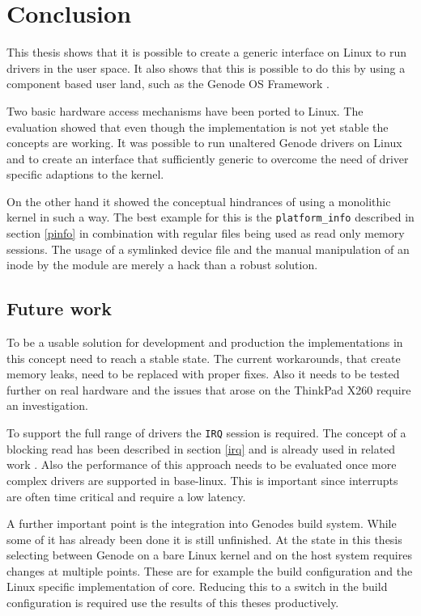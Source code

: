 \documentclass[
a4paper,
12pt,
notitlepage,
parskip=half,
DIV=11,
]{scrbook}
\begin{document}
	\chapter{Conclusion}
	
		This thesis shows that it is possible to create a generic interface on Linux to run drivers in the user space.
		It also shows that this is possible to do this by using a component based user land, such as the Genode OS Framework \citep{genode}.
		
		Two basic hardware access mechanisms have been ported to Linux.
		The evaluation showed that even though the implementation is not yet stable the concepts are working.
		It was possible to run unaltered Genode drivers on Linux and to create an interface that sufficiently generic to overcome the need of driver specific adaptions to the kernel.
		
		On the other hand it showed the conceptual hindrances of using a monolithic kernel in such a way.
		The best example for this is the \texttt{platform\_info} described in section \ref{pinfo} in combination with regular files being used as read only memory sessions.
		The usage of a symlinked device file and the manual manipulation of an inode by the module are merely a hack than a robust solution.
	
		\section{Future work}
		
		To be a usable solution for development and production the implementations in this concept need to reach a stable state.
		The current workarounds, that create memory leaks, need to be replaced with proper fixes.
		Also it needs to be tested further on real hardware and the issues that arose on the ThinkPad X260 require an investigation.
		
		To support the full range of drivers the \texttt{IRQ} session is required.
		The concept of a blocking read has been described in section \ref{irq} and is already used in related work \citep{uio}.
		Also the performance of this approach needs to be evaluated once more complex drivers are supported in base-linux.
		This is important since interrupts are often time critical and require a low latency.
		
		A further important point is the integration into Genodes build system.
		While some of it has already been done it is still unfinished.
		At the state in this thesis selecting between Genode on a bare Linux kernel and on the host system requires changes at multiple points.
		These are for example the build configuration and the Linux specific implementation of core.
		Reducing this to a switch in the build configuration is required use the results of this theses productively.
		
\end{document}
